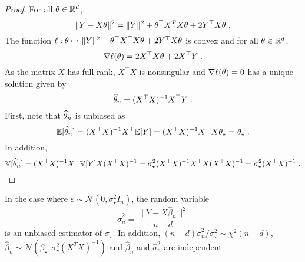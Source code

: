 \begin{proof}
For all $\theta\in\mathbb{R}^d$,
\[
 \|Y - X\theta\|^2 = \|Y\|^2 + \theta^\top X^TX\theta + 2Y^\top X\theta\;.
\]
The function $\ell:\theta \mapsto\|Y\|^2 + \theta^\top X^\top X\theta + 2Y^\top X\theta$ is convex and for all $\theta\in\mathbb{R}^d$,
\[
\nabla \ell (\theta) = 2X^\top X\theta + 2 X^\top Y\;.
\]
As the matrix  $X$ has full rank, $X^\top X$ is nonsingular and $\nabla \ell (\theta) =0$ has a unique solution given by
\[
\widehat {\theta}_n = (X^\top X)^{-1}X^\top Y\;.
\]
First, note that $\widehat {\theta}_n$ is unbiased as
\[
\mathbb{E}[\widehat {\theta}_n] = (X^\top X)^{-1}X^\top \mathbb{E}[Y] = (X^\top X)^{-1}X^\top X\theta_{\star} = \theta_\star\;.
\]
In addition,
\[
\mathbb{V}[\widehat {\theta}_n] = (X^\top X)^{-1}X^\top\mathbb{V}[Y]X(X^\top X)^{-1}= \sigma_\star^2(X^\top X)^{-1}X^\top X(X^\top X)^{-1} = \sigma_\star^2(X^\top X)^{-1}\;.
\]
\end{proof}

\begin{shaded}
\begin{proposition}
\label{prop:least:squares:full:rank}
In the case where $\varepsilon \sim \mathcal{N}(0,\sigma_\star^2I_n)$, the random variable
\[
\widehat \sigma^2_n =\frac{\|Y - X\widehat \beta_n \|^2}{n-d}
\]
is an unbiased estimator of $\sigma_\star$. In addition, $(n-d)\widehat \sigma^2_n/\sigma_\star^2\sim\chi^2(n-d)$, $\widehat \beta_n \sim \mathcal{N}(\beta_{\star},\sigma_\star^2(X^TX)^{-1})$ and $\widehat \beta_n$ and $\widehat \sigma^2_n$ are independent.
\end{proposition}
\end{shaded}

